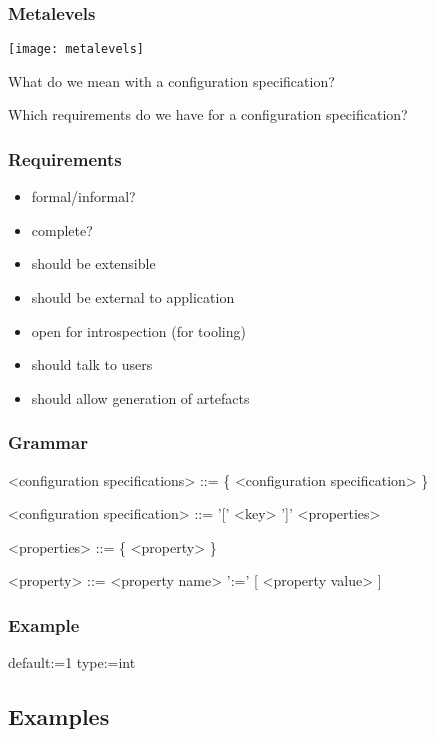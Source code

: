 \begin{frame}
	\frametitle{Metalevels}
	\texttt{[image: metalevels]}
\end{frame}

\begin{assignment}
	\begin{task}
	What do we mean with a configuration specification?
	\end{task}

	\begin{task}
	Which requirements do we have for a configuration specification?
	\end{task}
\end{assignment}


\begin{frame}
	\frametitle{Requirements}

	\begin{itemize}
	\item formal/informal?
	\item complete?
	\pause
	\item should be extensible
	\item should be external to application
	\item open for introspection (for tooling)
	\item should talk to users
	\item should allow generation of artefacts
	\end{itemize}
\end{frame}


\begin{frame}[fragile]
	\frametitle{Grammar}
	\begin{grammar}
	<configuration specifications> ::= \{ <configuration specification> \}

	<configuration specification> ::= '[' <key> ']' <properties>

	<properties> ::= \{ <property> \}

	<property> ::= <property name> ':=' [ <property value> ]
	\end{grammar}
\end{frame}


\begin{frame}[fragile]
	\frametitle{Example}
	\begin{code}
	default:=1
	type:=int
	\end{code}
\end{frame}

\subsection{Examples}

